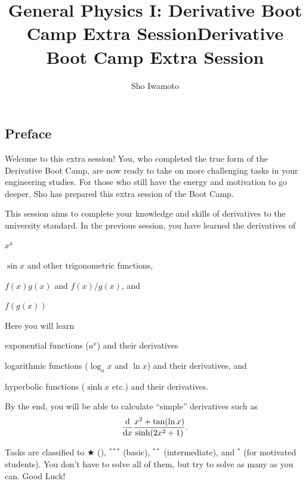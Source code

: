 \documentclass[11pt,pdfa,lastpage]{MishoNote}
\title{General Physics I: Derivative Boot Camp Extra Session}
\author{Sho Iwamoto}
\let\origfootnote\footnote
\let\origfootnoterule\footnoterule
\begin{document}
%
\title{Derivative Boot Camp Extra Session}\begin{maketitle}
\let\footnote\origfootnote
\let\footnoterule\origfootnoterule

\subsection*{Preface}
Welcome to this extra session!
You, who completed the true form of the Derivative Boot Camp, are now ready to take on more challenging tasks in your engineering studies.
For those who still have the energy and motivation to go deeper, Sho has prepared this extra session of the Boot Camp.

This session aims to complete your knowledge and skills of derivatives to the university standard.
In the previous session, you have learned the derivatives of
\begin{miniitemize}
  \item $x^a$
  \item $\sin x$ and other trigonometric functions,
  \item $f(x)g(x)$ and $f(x)/g(x)$, and
  \item $f(g(x))$
\end{miniitemize}
Here you will learn
\begin{miniitemize}
  \item exponential functions ($a^x$) and their derivatives
  \item logarithmic functions ($\log_a x$ and $\ln x$) and their derivatives, and
  \item hyperbolic functions ($\sinh x$ etc.) and their derivatives.
\end{miniitemize}
By the end, you will be able to calculate ``simple'' derivatives such as
\[
\diff{}{x}\frac{x^2+\tan(\ln x)}{\sinh(2x^2+1)}.
\]

Tasks are classified to $\bigstar$ (), $^{***}$ (basic), $^{**}$ (intermediate), and $^{*}$ (for motivated students).
You don't have to solve all of them, but try to solve as many as you can.
Good Luck!

\enlargethispage{-5em}


\end{maketitle}
\end{document}
